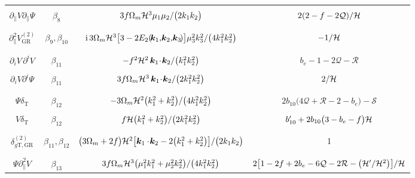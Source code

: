 \begin{longtable}{| c | c | c | c |}
&  &  & \\ 
$\partial_{\parallel}V\partial_{\parallel}\Psi$ & $\beta_{8}$ & ${3}f\Omega_{m}\mathcal{H}^{3}{\mu_{1}\mu_{2}/{\big(2k_{1}k_{2}\big)}}$ & ${2}(2-f-2\mathcal{Q})/{\mathcal{H}}$ \\
&  &  & \\ 
\hline
&  &  & \\ 
${\partial_{\parallel}^{2}V^{(2)}_{\mathrm{GR}}}$ & $\beta_{9},\beta_{10}$ & $\mathrm{i}\,3\Omega_{m}\mathcal{H}^{3}\big[3 -2 E_{2}(\!\bm{k}_{1},\!\bm{k}_{2},\!\bm{k}_{3}\!)\big]\mu_3^{2} k_3^{2}/\big(4k_{1}^{2}k_{2}^{2}\big)$ & $-1/\mathcal{H}$ \\
&  &  & \\ 
\hline
&  &  & \\ 
$\partial_{i}V\,\partial^{i}V$ & $\beta_{11}$ & $-f^{2}\mathcal{H}^{2}\,{\bm{k}_1\!\cdot\! \bm{k}_2}/{\big(k_{1}^{2}k_{2}^{2}\big)}$  & $ b_{e} -1- 2\mathcal{Q} - \mathcal{R}$ \\ 
&  &  & \\
$\partial_{i}V\partial^{i}\Psi$  &$\beta_{11}$ & $3f\Omega_{m}\mathcal{H}^{3} \,{\bm{k}_{1}\!\cdot\! \bm{k}_{2}}/{\big(2k_{1}^{2}k_{2}^{2}\big)} $ & ${2}/{\mathcal{H}}$  \\
&  &  & \\ 
\hline 
&  &  & \\
${\Psi\delta_{\mathrm{T}}}$ & $\beta_{12}$ &$-{3}\Omega_{m}\mathcal{H}^{2}{\big(k_{1}^{2}+k_{2}^{2}\big)}/{\big(4k_{1}^{2}k_{2}^{2}\big)} $& $2b_{10}\big(4\mathcal{Q}+\mathcal{R} -2-b_{e}\big) -{\mathcal{S}}$  \\ 
&  &  & \\
${V \delta_{\mathrm{T}}}$& $\beta_{12}$ & $f\mathcal{H}{\big(k_{1}^{2}+k_{2}^{2}\big)}/{\big(2k_{1}^{2}k_{2}^{2}\big)} $  & $b_{10}' + 2b_{10}\big(3-b_e-f\big)\mathcal{H}$ \\ 
&  &  & \\
\hline 
&  &  & \\
{$\delta^{(2)}_{{g \mathrm{T,GR}}}$}& ${\beta_{11},\beta_{12}}$ & {$\big(3\Omega_m+2f\big)\mathcal{H}^2\big[\bm{k}_{1}\cdot\!\bm{k}_{2}-2\big(k_1^2+k_2^2\big)\big]/\big(2k_{1}k_{2}\big)$} & 1 \\
&  &  & \\ 
\hline
&  &  & \\
$\Psi \partial^{2}_{\parallel}V$ & $\beta_{13}$ & ${3}f\Omega_{m}\mathcal{H}^{3}{\big(\mu_{1}^{2}k_{1}^{2} + \mu_{2}^{2}k_{2}^{2}\big)}/{\big(4k_{1}^{2}k_{2}^{2}\big)}$ &${2}\big[{1}-2f+2b_{e}-{6}\mathcal{Q}-2{\cal R}-\big({\mathcal{H}'}/{\mathcal{H}^{2}}\big)\big]/{\mathcal{H}}$ \\ 

\end{longtable}
